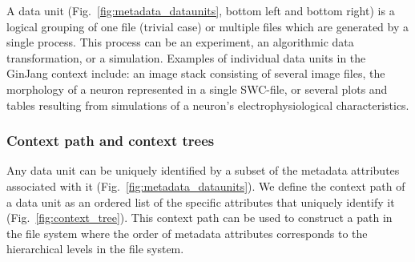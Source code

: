 \documentclass{frontiersSCNS} %
\begin{document}
A data unit (Fig.~\ref{fig:metadata_dataunits}, bottom left and bottom right)
is a logical grouping of one file (trivial case) or multiple files which are
generated by a single process. This process can be an experiment, an
algorithmic data transformation, or a simulation. Examples of individual data
units in the GinJang context include: an image stack consisting of several
image files, the morphology of a neuron represented in a single SWC-file, or
several plots and tables resulting from simulations of a neuron's
electrophysiological characteristics.

\subsubsection{Context path and context trees}

Any data unit can be uniquely identified by a subset of the metadata attributes
associated with it (Fig.~\ref{fig:metadata_dataunits}). We define the context
path of a data unit as an ordered list of the specific attributes that uniquely
identify it (Fig.~\ref{fig:context_tree}). This context path can be used to
construct a path in the file system where the order of metadata attributes
corresponds to the hierarchical levels in the file system.
\end{document}
